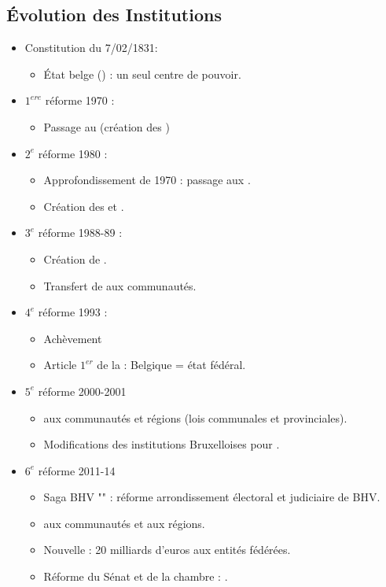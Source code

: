 \subsection{Évolution des Institutions}

\begin{itemize}
	\item Constitution du 7/02/1831:
	\begin{itemize}
		\item État belge () : un seul centre de pouvoir.
	\end{itemize}
	\item $1^{ere}$ réforme 1970 :
	\begin{itemize}
		\item Passage au  (création des )
	\end{itemize}
	\item $2^{e}$ réforme 1980 :
	\begin{itemize}
		\item Approfondissement de 1970 : passage aux .
		\item Création des  et .
	\end{itemize}
	\item $3^{e}$ réforme 1988-89 :
	\begin{itemize}
		\item Création de .
		\item Transfert de  aux communautés.
	\end{itemize}
	\item $4^{e}$ réforme 1993 :
	\begin{itemize}
		\item Achèvement
		\item Article $1^{er}$ de la  : Belgique = état fédéral.
	\end{itemize}
	\item $5^{e}$ réforme 2000-2001
	\begin{itemize}
		\item {} aux communautés et régions (lois communales et provinciales).
		\item Modifications des institutions Bruxelloises pour .
	\end{itemize}
	\item $6^{e}$ réforme 2011-14
	\begin{itemize}
		\item Saga BHV "" : réforme arrondissement électoral et judiciaire de BHV.
		\item {} aux communautés et aux régions.
		\item Nouvelle  : 20 milliards d'euros aux entités fédérées.
		\item Réforme du Sénat et de la chambre : .
	\end{itemize}
\end{itemize}

